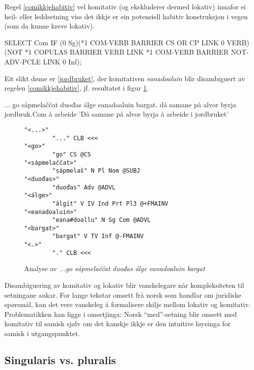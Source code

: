 \documentclass[a4paper,norsk]{article}
\begin{document}
Regel \ref{comikkjehabitiv} vel komitativ (og ekskluderer dermed lokativ) innafor ei heil- eller leddsetning viss det ikkje er ein potensiell habitiv konstruksjon i vegen (som da kunne kreve lokativ). %

\begin{example}\label{comikkjehabitiv}
SELECT Com IF (0 Sg)(*1 COM-VERB BARRIER CS OR CP LINK 0 VERB)
	(NOT *1 COPULAS BARRIER VERB LINK *1 COM-VERB BARRIER NOT-ADV-PCLE 
	LINK 0 Inf);    
\end{example}

Eit slikt døme er \ref{jordbruket}, der komitativen \emph{eanadoaluin} blir disambiguert av regelen \ref{comikkjehabitiv}, jf. resultatet i figur \ref{comverbana}.%

\begin{example}\label{jordbruket}
\gll ... go sápmelaččat duođas álge eanadoaluin bargat.
     {}  då samane {på alvor} byrja jordbruk.Com {å arbeide}
\glt 'Då samane på alvor byrja å arbeide i jordbruket'
\glend     
\end{example}

\begin{figure}[htbp]
\begin{center}
\begin{verbatim}
"<...>"
        "..." CLB <<<
"<go>"
        "go" CS @CS
"<sápmelaččat>"
        "sápmelaš" N Pl Nom @SUBJ
"<duođas>"
        "duođas" Adv @ADVL
"<álge>"
        "álgit" V IV Ind Prt Pl3 @+FMAINV
"<eanadoaluin>"
        "eana#doallu" N Sg Com @ADVL
"<bargat>"
        "bargat" V TV Inf @-FMAINV
"<.>"
        "." CLB <<<
\end{verbatim}
\caption{Analyse av \textit{...go sápmelaččat duođas álge eanadoaluin bargat}}
\label{comverbana}
\end{center}
\end{figure}



Disambiguering av komitativ og lokativ blir vanskelegare når kompleksiteten til setningane aukar. For lange tekstar omsett frå norsk som handlar om juridiske spørsmål, kan det vere vanskeleg å formalisere skilje mellom lokativ og komitativ. Problematikken kan ligge i omsetjinga: Norsk ``med''-setning blir omsett med komitativ til samisk sjølv om det kanskje ikkje er den intuitive løysinga for samisk i utgangspunktet. %



\subsection{Singularis vs. pluralis}
\end{document}

